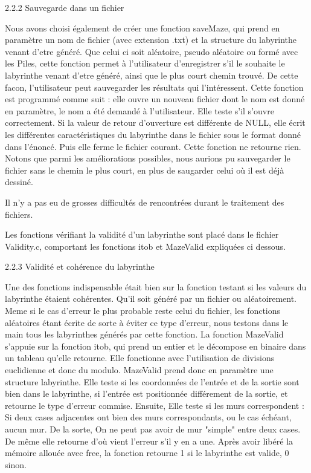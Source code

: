 2.2.2 Sauvegarde dans un fichier
 
Nous avons choisi également de créer une fonction saveMaze, qui prend en paramètre un nom de fichier (avec extension .txt) et la structure du labyrinthe venant d'etre généré. Que celui ci soit aléatoire, pseudo aléatoire ou formé avec les Piles, cette fonction permet à l'utilisateur d'enregistrer s'il le souhaite le labyrinthe venant d'etre généré, ainsi que le plus court chemin trouvé. De cette facon, l'utilisateur peut sauvegarder les résultats qui l'intéressent.
Cette fonction est programmé comme suit : elle ouvre un nouveau fichier dont le nom est donné en paramètre, le nom a été demandé à l'utilisateur. Elle teste s'il s'ouvre correctement. Si la valeur de retour d'ouverture est différente de NULL, elle écrit les différentes caractéristiques du labyrinthe dans le fichier sous le format donné dans l'énoncé. Puis elle ferme le fichier courant. Cette fonction ne retourne rien.
Notons que parmi les améliorations possibles, nous aurions pu sauvegarder le fichier sans le chemin le plus court, en plus de saugarder celui où il est déjà dessiné.

Il n'y a pas eu de grosses difficultés de rencontrées durant le traitement des fichiers.

Les fonctions vérifiant la validité d'un labyrinthe sont placé dans le fichier Validity.c, comportant les fonctions itob et MazeValid expliquées ci dessous.

2.2.3 Validité et cohérence du labyrinthe

Une des fonctions indispensable était bien sur la fonction testant si les valeurs du labyrinthe étaient cohérentes. Qu'il soit généré par un fichier ou aléatoirement. Meme si le cas d'erreur le plus probable reste celui du fichier, les fonctions aléatoires étant écrite de sorte à éviter ce type d'erreur, nous testons dans le main tous les labyrinthes générés par cette fonction. 
La fonction MazeValid s'appuie sur la fonction itob, qui prend un entier et le décompose en binaire dans un tableau qu'elle retourne. Elle fonctionne avec l'utilisation de divisions euclidienne et donc du modulo. 
MazeValid prend donc en paramètre une structure labyrinthe. Elle teste si les coordonnées de l'entrée et de la sortie sont bien dans le labyrinthe, si l'entrée est positionnée différement de la sortie, et retourne le type d'erreur commise.
Ensuite, Elle teste si les murs correspondent : Si deux cases adjacentes ont bien des murs correspondants, ou le cas échéant, aucun mur. De la sorte, On ne peut pas avoir de mur "simple" entre deux cases. De même elle retourne d'où vient l'erreur s'il y en a une. Après avoir libéré la mémoire allouée avec free, la fonction retourne 1 si le labyrinthe est valide, 0 sinon.

